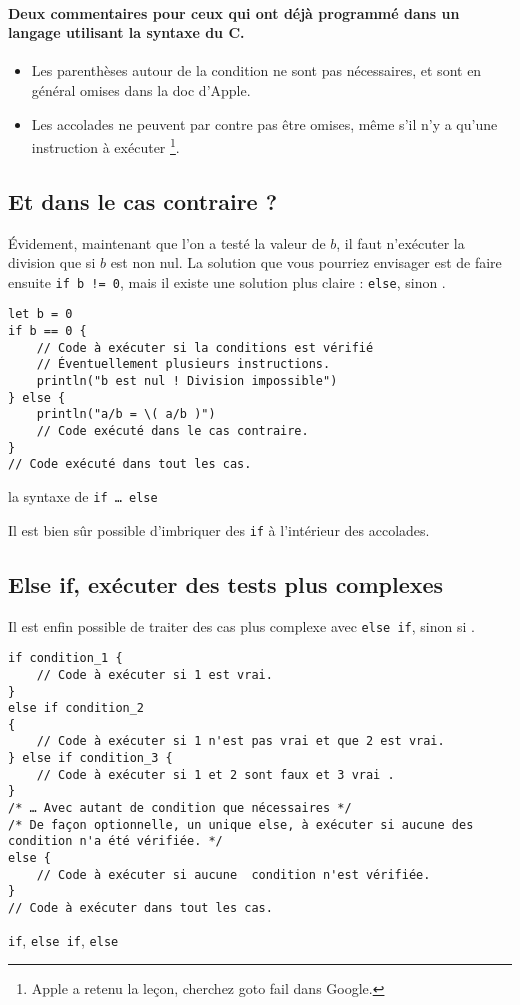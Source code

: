 \paragraph{Deux commentaires pour ceux qui ont déjà programmé
dans un langage utilisant la syntaxe du C.}
\begin{itemize}
\item Les parenthèses autour de la condition ne sont pas nécessaires,
et sont en général omises dans la doc d'Apple.
\item Les accolades ne peuvent par contre pas être omises,
même s'il n'y a qu'une instruction à exécuter
\footnote{Apple a retenu la leçon, cherchez \og goto fail \fg{} dans Google.}.
\end{itemize}
\subsection{Et dans le cas contraire ?}
Évidement, maintenant que l'on a testé la valeur de $b$, il faut n'exécuter la division que si $b$ est non nul.
La solution que vous pourriez envisager est de faire ensuite
\texttt{if b != 0},
mais il existe une solution plus claire : \texttt{else}, \og sinon \fg{}.
\begin{listing}[h]
\begin{verbatim}
let b = 0
if b == 0 {
    // Code à exécuter si la conditions est vérifié
    // Éventuellement plusieurs instructions.
    println("b est nul ! Division impossible")
} else {
    println("a/b = \( a/b )")
    // Code exécuté dans le cas contraire.
}
// Code exécuté dans tout les cas.
\end{verbatim}
\caption{la syntaxe de \texttt{if … else}}
\end{listing} %

Il est bien sûr possible d'imbriquer des \texttt{if} à l'intérieur des accolades.
\subsection{Else if, exécuter des tests plus complexes}
Il est enfin possible de traiter des cas plus complexe avec \texttt{else if}, \og sinon si \fg{}.

\begin{listing}[h]
\begin{verbatim}
if condition_1 {
    // Code à exécuter si 1 est vrai.
}
else if condition_2
{
    // Code à exécuter si 1 n'est pas vrai et que 2 est vrai.
} else if condition_3 {
    // Code à exécuter si 1 et 2 sont faux et 3 vrai .
}
/* … Avec autant de condition que nécessaires */
/* De façon optionnelle, un unique else, à exécuter si aucune des condition n'a été vérifiée. */
else {
    // Code à exécuter si aucune  condition n'est vérifiée.
}
// Code à exécuter dans tout les cas.
\end{verbatim}
\caption{\texttt{if}, \texttt{else if}, \texttt{else}}
\end{listing}
